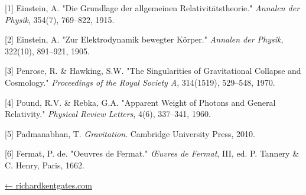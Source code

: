 \documentclass[
  10pt,
]{article}
\begin{document}
{[}1{]} Einstein, A. "Die Grundlage der allgemeinen
Relativitätstheorie." \emph{Annalen der Physik}, 354(7), 769--822, 1915.

{[}2{]} Einstein, A. "Zur Elektrodynamik bewegter Körper." \emph{Annalen
der Physik}, 322(10), 891--921, 1905.

{[}3{]} Penrose, R. \& Hawking, S.W. "The Singularities of Gravitational
Collapse and Cosmology." \emph{Proceedings of the Royal Society A},
314(1519), 529--548, 1970.

{[}4{]} Pound, R.V. \& Rebka, G.A. "Apparent Weight of Photons and
General Relativity." \emph{Physical Review Letters}, 4(6), 337--341,
1960.

{[}5{]} Padmanabhan, T. \emph{Gravitation}. Cambridge University Press,
2010.

{[}6{]} Fermat, P. de. "Oeuvres de Fermat." \emph{Œuvres de Fermat},
III, ed. P. Tannery \& C. Henry, Paris, 1662.

\href{https://richardkentgates.com/}{← richardkentgates.com}
\end{document}
